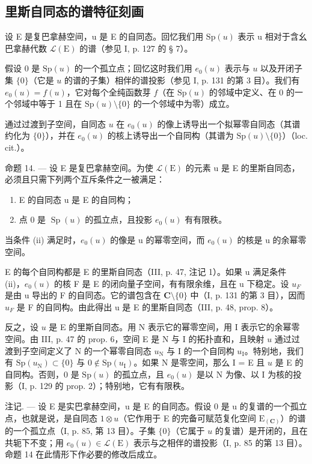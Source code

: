 \subsection{里斯自同态的谱特征刻画}

设 E 是复巴拿赫空间，u 是 E 的自同态。回忆我们用 \(\mathrm{Sp}(u)\) 表示 u 相对于含幺巴拿赫代数 \(\mathcal{L}(\mathrm{E})\) 的谱（参见 I, p. 127 的 § 7）。

假设 0 是 \(\mathrm{Sp}(u)\) 的一个孤立点；回忆这时我们用 \(e_0(u)\) 表示与 \(u\) 以及开闭子集 \(\{0\}\)（它是 \(u\) 的谱的子集）相伴的谱投影（参见 I, p. 131 的第 3 目）。我们有 \(e_0(u) = f(u)\)，它对每个全纯函数芽 \(f\)（在 \(\mathrm{Sp}(u)\) 的邻域中定义、在 0 的一个邻域中等于 1 且在 \(\mathrm{Sp}(u) \setminus \{0\}\) 的一个邻域中为零）成立。

通过过渡到子空间，自同态 \(u\) 在 \(e_0(u)\) 的像上诱导出一个拟幂零自同态（其谱约化为 \(\{0\}\)），并在 \(e_0(u)\) 的核上诱导出一个自同构（其谱为 \(\mathrm{Sp}(u) \setminus \{0\}\)）（loc. cit.）。

命题 14. --- 设 E 是复巴拿赫空间。为使 \(\mathcal{L}(\mathrm{E})\) 的元素 u 是 E 的里斯自同态，必须且只需下列两个互斥条件之一被满足：

\begin{enumerate}
\def\labelenumi{(\roman{enumi})}
\item
  E 的自同态 u 是 E 的自同构；
\item
  点 0 是 \(\operatorname{Sp}(u)\) 的孤立点，且投影 \(e_0(u)\) 有有限秩。
\end{enumerate}

当条件 (ii) 满足时，\(e_{0}(u)\) 的像是 u 的幂零空间，而 \(e_{0}(u)\) 的核是 u 的余幂零空间。

E 的每个自同构都是 E 的里斯自同态（III, p. 47, 注记 1）。如果 u 满足条件 (ii)，\(e_{0}(u)\) 的核 F 是 E 的闭向量子空间，有有限余维，且在 u 下稳定。设 \(u_{F}\) 是由 u 导出的 F 的自同态。它的谱包含在 \(\mathbf{C}\setminus\{0\}\) 中（I, p. 131 的第 3 目），因而 \(u_{F}\) 是 F 的自同构。由此得出 u 是 E 的里斯自同态（III, p. 48, prop. 8）。

反之，设 \(u\) 是 E 的里斯自同态。用 N 表示它的幂零空间，用 I 表示它的余幂零空间。由 III, p. 47 的 prop. 6，空间 E 是 N 与 I 的拓扑直和，且映射 \(u\) 通过过渡到子空间定义了 N 的一个幂零自同态 \(u_{\mathrm{N}}\) 与 I 的一个自同构 \(u_{\mathrm{I}}\)。特别地，我们有 \(\mathrm{Sp}(u_{\mathrm{N}}) \subset \{0\}\) 与 \(0 \not\in \mathrm{Sp}(u_{\mathrm{I}})\)。如果 N 是零空间，那么 I = E 且 \(u\) 是 E 的自同构。否则，0 是 \(\mathrm{Sp}(u)\) 的孤立点，且 \(e_0(u)\) 是以 N 为像、以 I 为核的投影（I, p. 129 的 prop. 2）；特别地，它有有限秩。

注记. --- 设 E 是实巴拿赫空间，u 是 E 的自同态。假设 0 是 u 的复谱的一个孤立点，也就是说，是自同态 \(1 \otimes u\)（它作用于 E 的完备可赋范复化空间 \(\mathrm{E}_{(\mathbf{C})}\)）的谱的一个孤立点（I, p. 85, 第 13 目）。子集 \(\{0\}\)（它属于 \(u\) 的复谱）是开闭的，且在共轭下不变；用 \(e_0(u) \in \mathcal{L}(\mathrm{E})\) 表示与之相伴的谱投影（I, p. 85 的第 13 目）。命题 14 在此情形下作必要的修改后成立。

